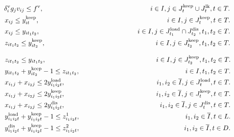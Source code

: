 \begin{center}
\begin{align}
&\hspace{2.9em} {\delta_{i}^{\rm{v}}}{g_{j}} {v_{ij}} \leq f^{\rm{v}}, \hspace{16.00em} i \in I, j \in J_{t}^{\rm{keep}} \cup J_{t}^{\rm{lk}}, t \in T. \\
&\hspace{3.0em} {x_{ij}} \leq {y_{it}^{\rm{keep}}}, \hspace{19.11em} i \in I, j \in J_{t}^{\rm{keep}}, t \in T. \\
&\hspace{3.0em} {x_{ij}} \leq {y_{it_1t_2}}, \hspace{14.61em} i \in I, j \in J_{t_1}^{\rm{load}} \cap J_{t_2}^{\rm{dis}}, {t_1},{t_2} \in T. \\
&\hspace{3.0em} {z_{it_1t_2}} \leq {y_{it_2}^{\rm{keep}}} ,  \hspace{16.50em} i \in I, j \in J_{t_2}^{\rm{keep}}, t_1,t_2 \in T.
\end{align}
\end{center}


\begin{center}
\begin{align}
&\hspace{3.0em} {z_{it_1t_2}} \leq {y_{it_1t_2}} ,  \hspace{16.49em} i \in I, j \in J_{t_2}^{\rm{keep}}, t_1,t_2 \in T. \\
&\hspace{3.0em} {y_{it_1t_2}} + y_{it_2}^{\rm{keep}} - 1 \leq {z_{it_1t_2}}, \hspace{15.79em} i \in I, t_1,t_2 \in T. \\
&\hspace{3.0em} {x_{i_1j}} + {x_{i_2j}} \leq 2{y_{i_1i_2t}^{\rm{load}}}, \hspace{13.71em} i_1, i_2 \in \overline{I}, j \in J_{t}^{\rm{load}}, t \in T. \\
&\hspace{3.0em} {x_{i_1j}} + {x_{i_2j}} \leq 2{y_{i_1i_2t}^{\rm{keep}}}, \hspace{13.64em} i_1, i_2 \in \overline{I}, j \in J_{t}^{\rm{keep}}, t \in T. \\
&\hspace{3.0em} {x_{i_1j}} + {x_{i_2j}} \leq 2{y_{i_1i_2t}^{\rm{dis}}}, \hspace{14.19em} i_1, i_2 \in \overline{I}, j \in J_{t}^{\rm{dis}}, t \in T. \\
&\hspace{3.0em} {y_{i_1i_2t}^{\rm{load}}} + y_{i_1i_2t}^{\rm{keep}} - 1 \leq {z_{i_1i_2t}^1}, \hspace{15.77em}  i_1, i_2 \in \overline{I}, t \in L. \\
&\hspace{3.0em} {y_{i_1i_2t}^{\rm{dis}}} + y_{i_1i_2t}^{\rm{keep}} - 1 \leq {z_{i_1i_2t}^2}, \hspace{15.58em}  i_1, i_2 \in \overline{I}, t \in D.
\end{align}
\end{center}
